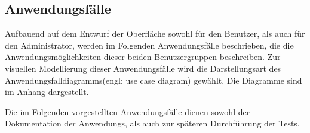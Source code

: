 \subsection{Anwendungsfälle}
\label{sec:Anwendungsfaelle}


Aufbauend auf dem Entwurf der Oberfläche sowohl für den Benutzer, als auch für den Administrator, werden im Folgenden Anwendungsfälle beschrieben, die die Anwendungsmöglichkeiten dieser beiden Benutzergruppen beschreiben. Zur visuellen Modellierung dieser Anwendungsfälle wird die Darstellungsart des Anwendungsfalldiagramms\footnotemark (engl: use case diagram) gewählt. Die Diagramme sind im Anhang dargestellt.


Die im Folgenden vorgestellten Anwendungsfälle dienen sowohl der Dokumentation der Anwendungs, als auch zur späteren Durchführung der Tests.